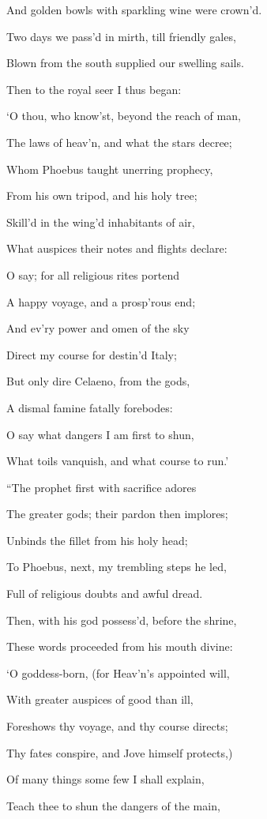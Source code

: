 And golden bowls with sparkling wine were crown’d.

Two days we pass’d in mirth, till friendly gales,

Blown from the south supplied our swelling sails.

Then to the royal seer I thus began:

‘O thou, who know’st, beyond the reach of man,

The laws of heav’n, and what the stars decree;

Whom Phoebus taught unerring prophecy,

From his own tripod, and his holy tree;

Skill’d in the wing’d inhabitants of air,

What auspices their notes and flights declare:

O say; for all religious rites portend

A happy voyage, and a prosp’rous end;

And ev’ry power and omen of the sky

Direct my course for destin’d Italy;

But only dire Celaeno, from the gods,

A dismal famine fatally forebodes:

O say what dangers I am first to shun,

What toils vanquish, and what course to run.’

“The prophet first with sacrifice adores

The greater gods; their pardon then implores;

Unbinds the fillet from his holy head;

To Phoebus, next, my trembling steps he led,

Full of religious doubts and awful dread.

Then, with his god possess’d, before the shrine,

These words proceeded from his mouth divine:

‘O goddess-born, (for Heav’n’s appointed will,

With greater auspices of good than ill,

Foreshows thy voyage, and thy course directs;

Thy fates conspire, and Jove himself protects,)

Of many things some few I shall explain,

Teach thee to shun the dangers of the main,

